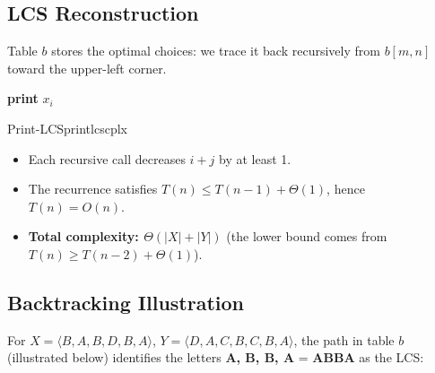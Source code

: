 \subsection{LCS Reconstruction}

Table $b$ stores the optimal choices: we trace it back recursively from
$b[m, n]$ toward the upper-left corner.

\begin{algorithm}[H]
\caption{Print-LCS($b$, $X$, $i$, $j$)}
\begin{algorithmic}[1]
    \State \Return
\EndIf
{}
    \State {}
    \State \textbf{print} $x_i$         
    \State {}
\Else
    \State {}
\EndIf
\end{algorithmic}
\end{algorithm}

\begin{complexity}{Print-LCS}{printlcscplx}
\begin{itemize}[noitemsep]
  \item Each recursive call decreases $i + j$ by at least 1.
  \item The recurrence satisfies $T(n) \le T(n-1) + \Theta(1)$, hence $T(n) = O(n)$.
  \item \textbf{Total complexity: $\Theta(|X| + |Y|)$}
        (the lower bound comes from $T(n) \ge T(n-2) + \Theta(1)$).
\end{itemize}
\end{complexity}

\subsection{Backtracking Illustration}

For $X = \langle B,A,B,D,B,A \rangle$, $Y = \langle D,A,C,B,C,B,A \rangle$,
the path in table $b$ (illustrated below) identifies the letters \textbf{A, B, B, A}
= \textbf{ABBA} as the LCS:

